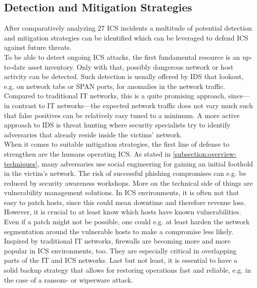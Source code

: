 \documentclass[runningheads]{llncs}
\begin{document}
\subsection{Detection and Mitigation Strategies}
\label{subsection:overview-mitigation}
After comparatively analyzing 27 ICS incidents a multitude of potential detection and mitigation strategies can be identified which can be leveraged to defend ICS against future threats.\\
To be able to detect ongoing ICS attacks, the first fundamental resource is an up-to-date asset inventory.
Only with that, possibly dangerous network or host activity can be detected.
Such detection is usually offered by IDS that lookout, e.g. on network tabs or SPAN ports, for anomalies in the network traffic.
Compared to traditional IT networks, this is a quite promising approach, since---in contrast to IT networks---the expected network traffic does not vary much such that false positives can be relatively easy tuned to a minimum.
A more active approach to IDS is threat hunting where security specialists try to identify adversaries that already reside inside the victims' network.\\
When it comes to suitable mitigation strategies, the first line of defense to strengthen are the humans operating ICS.
As stated in \autoref{subsection:overview-techniques}, many adversaries use social engineering for gaining an initial foothold in the victim's network.
The risk of successful phishing compromises can e.g. be reduced by security awareness workshops.
More on the technical side of things are vulnerability management solutions.
In ICS environments, it is often not that easy to patch hosts, since this could mean downtime and therefore revenue loss.
However, it is crucial to at least know which hosts have known vulnerabilities.
Even if a patch might not be possible, one could e.g. at least harden the network segmentation around the vulnerable hosts to make a compromise less likely.
Inspired by traditional IT networks, firewalls are becoming more and more popular in ICS environments, too.
They are especially critical in overlapping parts of the IT and ICS networks.
Last but not least, it is essential to have a solid backup strategy that allows for restoring operations fast and reliable, e.g. in the case of a ransom- or wiperware attack.
\end{document}
